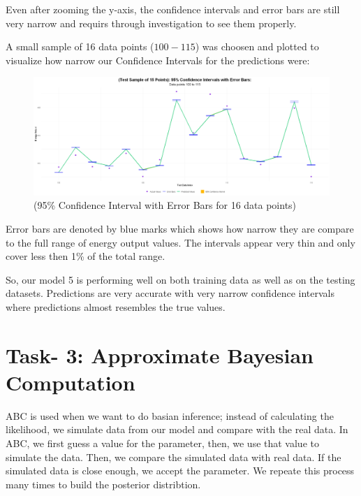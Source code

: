 \documentclass[12pt,a4paper]{article}
\begin{document}
Even after zooming the y-axis, the confidence intervals and
error bars are still very narrow and requirs through investigation to see them properly.

A small sample of 16 data points ($100-115$) was choosen and plotted to visualize how
narrow our Confidence Intervals for the predictions were:

\begin{figure}[H]
  \centering
  \includegraphics[width=\textwidth]{y23.png}
  \caption{(95\% Confidence Interval with Error Bars for 16 data points)}
  \label{fig:CI for testing data with Error Bars for 16 data points}
\end{figure}

Error bars are denoted by blue marks which shows how narrow they are compare to the 
full range of energy output values. The intervals appear very thin and only cover less then 1\% 
of the total range. 

So, our model 5 is performing well on both training data as well as on the testing datasets. Predictions are 
very accurate with very narrow confidence intervals where predictions almost resembles the true values. 


\section*{Task- 3: Approximate Bayesian Computation}
ABC is used when we want to do basian inference; 
instead of calculating the likelihood, we simulate data
from our model and compare with the real data. In ABC, 
we first guess a value for the parameter, 
then, we use that value to simulate the data. Then, we compare 
the simulated data with real data. If the simulated data 
is close enough, we accept the parameter. We repeate this 
process many times to build the posterior distribtion. 
\end{document}
